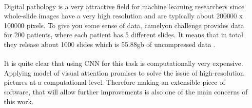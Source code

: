 \paragraph{}
Digital pathology is a very attractive field for machine learning researchers
since whole-slide images have a very high resolution and are typically about 200000 x 100000 pixels.
To give you some sense of data, camelyon challenge provides data for 200 patients,
where each patient has 5 different slides. It means that in total they release
about 1000 slides which is 55.88gb of uncompressed data \cite{CAMEL}.

\paragraph{}
It is quite clear that using \gls{CNN} for this task is computationally very expensive.
Applying model of visual attention promises to solve the issue of
high-resolution pictures at a computational level.
Therefore making an extensible piece of software, that will allow further
improvements is also one of the main concerns of this work.




